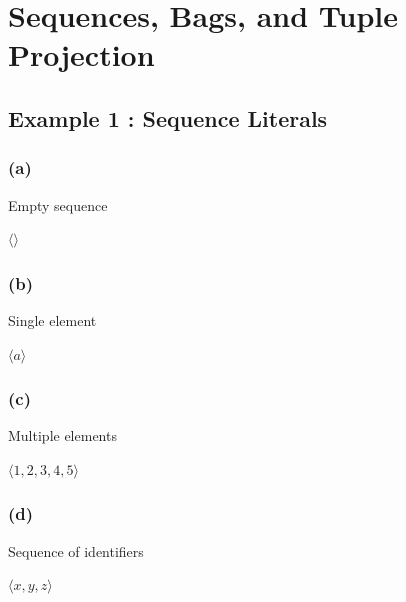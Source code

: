 \documentclass[a4paper,10pt,fleqn]{article}
\begin{document}
\section*{Sequences, Bags, and Tuple Projection}

\subsection*{Example 1 : Sequence Literals}

\subsubsection*{(a)}

\noindent Empty sequence

\bigskip

\noindent
$\langle \rangle$


\medskip

\subsubsection*{(b)}

\noindent Single element

\bigskip

\noindent
$\langle a \rangle$


\medskip

\subsubsection*{(c)}

\noindent Multiple elements

\bigskip

\noindent
$\langle 1, 2, 3, 4, 5 \rangle$


\medskip

\subsubsection*{(d)}

\noindent Sequence of identifiers

\bigskip

\noindent
$\langle x, y, z \rangle$
\end{document}
